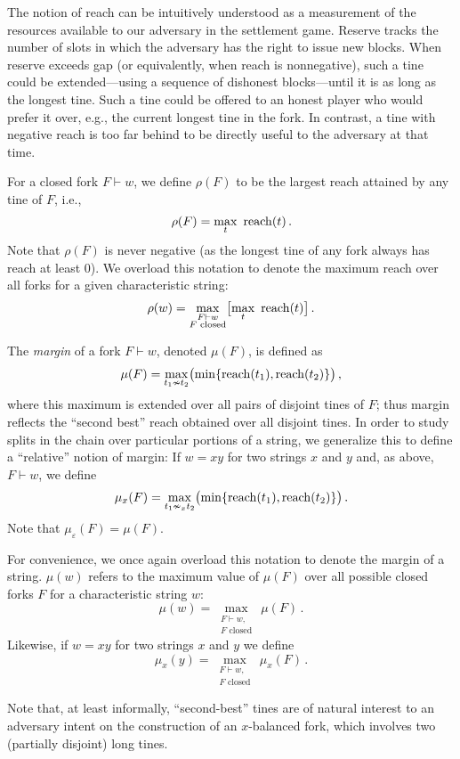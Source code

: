 The notion of reach can be intuitively understood as a measurement of
the resources available to our adversary in the settlement
game. Reserve tracks the number of slots in which the adversary has
the right to issue new blocks.  When reserve exceeds gap (or
equivalently, when reach is nonnegative), such a tine could be
extended---using a sequence of dishonest blocks---until it is as long
as the longest tine. Such a tine could be offered to an honest player
who would prefer it over, e.g., the current longest tine in the
fork. In contrast, a tine with negative reach is too far behind to be
directly useful to the adversary at that time.

\begin{definition}
For a closed fork $F\vdash w$, we define $\rho(F)$ to be the largest reach attained by any tine of $F$, i.e., 
\[
\rho(F)=\underset{t}\max \ \reach(t)\,.
\]
Note that $\rho(F)$ is never negative (as the longest tine of any fork always has reach at least 0). We overload this notation to denote the maximum reach over all forks for a given characteristic string: 
\[
\rho(w)=\underset{\substack{F\vdash w\\\text{$F$ closed}}}\max\big[\underset{t}\max \ \operatorname{reach}(t)\big]\,.
\]
\end{definition}

\begin{definition}[Margin]\label{def:margin}
The \emph{margin} of a fork $F\vdash w$, denoted $\mu(F)$, is defined as 
\begin{equation}\label{eq:margin-absolute}
\mu(F)=\underset{t_1\nsim t_2}\max \bigl(\min\{\operatorname{reach}(t_1),\operatorname{reach}(t_2)\}\bigr)\,,
\end{equation}
where this maximum is extended over all pairs of disjoint tines of
$F$; thus margin reflects the ``second best'' reach obtained over all
disjoint tines. In order to study splits in the chain over particular portions of a
string, we generalize this to define a ``relative'' notion of margin:
If $w = xy$ for two strings $x$ and $y$ and, as above, $F \vdash w$,
we define
\[
  \mu_x(F)=\underset{t_1\nsim_x t_2}\max \bigl(\min\{\operatorname{reach}(t_1),\operatorname{reach}(t_2)\}\bigr)\,.
\]
Note that $\mu_\varepsilon(F) = \mu(F)$.

For convenience, we once again overload this notation to denote the
margin of a string. $\mu(w)$ refers to the maximum value of $\mu(F)$
over all possible closed forks $F$ for a characteristic string $w$:
\[
\mu(w)=\underset{\substack{F\vdash w,\\ \text{$F$ closed}}}\max \, \mu(F)\,.
\]
Likewise, if $w = xy$ for two strings $x$ and $y$ we define
\[
\mu_x(y)=\underset{\substack{F\vdash w,\\ \text{$F$ closed}}} \max \, \mu_x(F)\,.
\]
\end{definition}
Note that, at least informally, ``second-best'' tines are of natural
interest to an adversary intent on the construction of an $x$-balanced fork, 
which involves two (partially disjoint) long tines.


